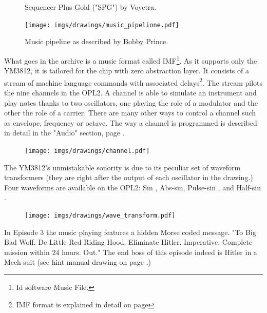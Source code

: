 \documentclass[book.tex]{subfiles}
\begin{document}
\begin{figure}[H]
\centering
\caption{Sequencer Plus Gold ("SPG") by Voyetra.}
\end{figure}

\begin{figure}[H]
\centering

 \texttt{[image: imgs/drawings/music\_pipelione.pdf]}
 \caption{Music pipeline as described by Bobby Prince.}
\end{figure}
What goes in the  archive is a music format called IMF\footnote{Id software Music File.}. As it supports only the YM3812, it is tailored for the chip with zero abstraction layer. It consists of a stream of machine language commands with associated delays\footnote{IMF format is explained in detail on page \pageref{IMF_explanation}}. The stream pilots the nine channels in the OPL2. A channel is able to simulate an instrument and play notes thanks to two oscillators, one playing the role of a modulator and the other the role of a carrier. There are many other ways to control a channel such as envelope, frequency or octave. The way a channel is programmed is described in detail in the "Audio" section, page \pageref{IMF_explanation}.
\begin{figure}[H]
\centering
 \texttt{[image: imgs/drawings/channel.pdf]}
\end{figure}
\par
{}  The YM3812's unmistakable sonority is due to its peculiar set of waveform transformers (they are right after the output of each oscillator in the drawing.) Four waveforms are available on the OPL2: Sin , Abs-sin, Pulse-sin , and Half-sin .
\par
\begin{figure}[H]
\centering
 \texttt{[image: imgs/drawings/wave\_transform.pdf]}
\end{figure}


 In Episode 3 the music playing features a hidden Morse coded message. "To Big Bad Wolf. De Little Red Riding Hood. Eliminate Hitler. Imperative. Complete mission within 24 hours. Out." The end boss of this episode indeed is Hitler in a Mech suit (see hint manual drawing on page \pageref{hitler_drawing}.)
\end{document}

